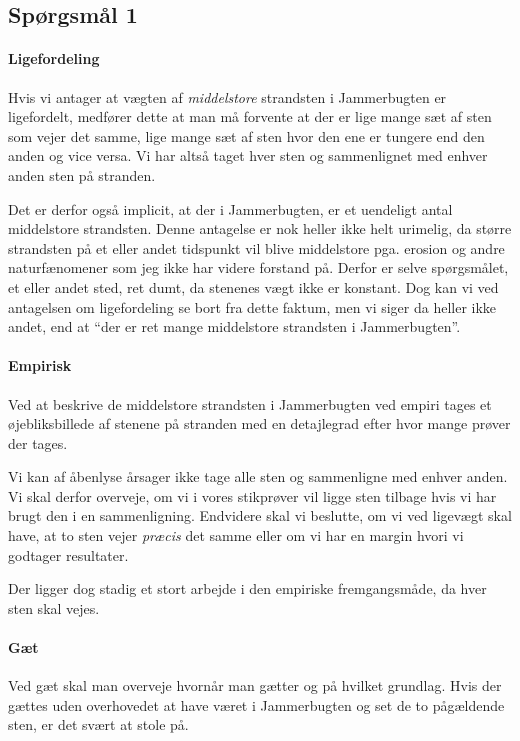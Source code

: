 \documentclass[a4paper, 11pt, danish, final]{article}
\title{\mytitle}
\subtitle{\mysubtitle}
\author{\myauthor{} - \mymail}
\date{\mydate}
\begin{document}
\maketitle

\subsection*{Spørgsmål 1}
\paragraph{Ligefordeling}
Hvis vi antager at vægten af \emph{middelstore} strandsten i
Jammerbugten er ligefordelt, medfører dette at man må forvente at der er
lige mange sæt af sten som vejer det samme, lige mange sæt af sten hvor
den ene er tungere end den anden og vice versa. Vi har altså taget hver
sten og sammenlignet med enhver anden sten på stranden.

Det er derfor også implicit, at der i Jammerbugten, er et uendeligt
antal middelstore strandsten. Denne antagelse er nok heller ikke helt
urimelig, da større strandsten på et eller andet tidspunkt vil blive
middelstore pga.  erosion og andre naturfænomener som jeg ikke har
videre forstand på. Derfor er selve spørgsmålet, et eller andet sted,
ret dumt, da stenenes vægt ikke er konstant. Dog kan vi ved antagelsen
om ligefordeling se bort fra dette faktum, men vi siger da heller ikke
andet, end at ``der er ret mange middelstore strandsten i
Jammerbugten''.

\paragraph{Empirisk}
Ved at beskrive de middelstore strandsten i Jammerbugten ved empiri
tages et øjebliksbillede af stenene på stranden med en detajlegrad efter
hvor mange prøver der tages.

Vi kan af åbenlyse årsager ikke tage alle sten og sammenligne med enhver
anden. Vi skal derfor overveje, om vi i vores stikprøver vil ligge sten
tilbage hvis vi har brugt den i en sammenligning. Endvidere skal vi
beslutte, om vi ved ligevægt skal have, at to sten vejer \emph{præcis}
det samme eller om vi har en margin hvori vi godtager resultater.

Der ligger dog stadig et stort arbejde i den empiriske fremgangsmåde, da
hver sten skal vejes.

\paragraph{Gæt}
Ved gæt skal man overveje hvornår man gætter og på hvilket grundlag.
Hvis der gættes uden overhovedet at have været i Jammerbugten og set de
to pågældende sten, er det svært at stole på.
\end{document}
